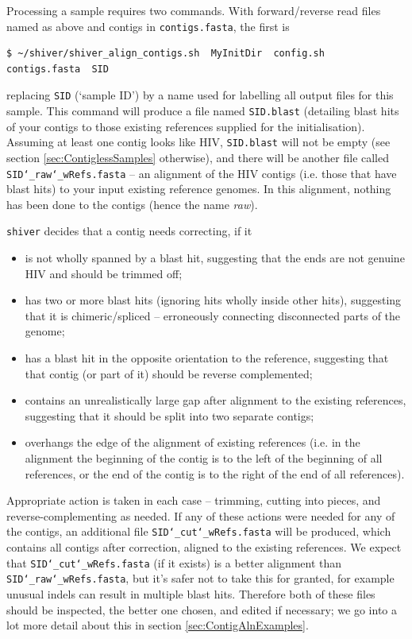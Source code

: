 \documentclass{article}
\newcommand{\shiv}{\c{shiver}\xspace}
\let\c\texttt
\begin{document}
Processing a sample requires two commands.
With forward/reverse read files named as above and contigs in \c{contigs.fasta}, the first is  
\begin{Verbatim}[samepage=true]
$ ~/shiver/shiver_align_contigs.sh  MyInitDir  config.sh  contigs.fasta  SID
\end{Verbatim}
replacing \c{SID} (`sample ID') by a name used for labelling all output files for this sample.
This command will produce a file named \c{SID.blast} (detailing blast hits of your contigs to those existing references supplied for the initialisation).
Assuming at least one contig looks like HIV, \c{SID.blast} will not be empty (see section \ref{sec:ContiglessSamples} otherwise), and there will be another file called \c{SID\char`_raw\char`_wRefs.fasta} -- an alignment of the HIV contigs (i.e. those that have blast hits) to your input existing reference genomes.
In this alignment, nothing has been done to the contigs (hence the name {\it raw}).

\shiv decides that a contig needs correcting, if it
\begin{itemize}
 \item is not wholly spanned by a blast hit, suggesting that the ends are not genuine HIV and should be trimmed off;
 \item has two or more blast hits (ignoring hits wholly inside other hits), suggesting that it is chimeric/spliced -- erroneously connecting disconnected parts of the genome;
 \item has a blast hit in the opposite orientation to the reference, suggesting that that contig (or part of it) should be reverse complemented;
 \item contains an unrealistically large gap after alignment to the existing references, suggesting that it should be split into two separate contigs;
 \item overhangs the edge of the alignment of existing references (i.e. in the alignment the beginning of the contig is to the left of the beginning of all references, or the end of the contig is to the right of the end of all references).
\end{itemize}
Appropriate action is taken in each case -- trimming, cutting into pieces, and reverse-complementing as needed.
If any of these actions were needed for any of the contigs, an additional file \c{SID\char`_cut\char`_wRefs.fasta} will be produced, which contains all contigs after correction, aligned to the existing references.
We expect that \c{SID\char`_cut\char`_wRefs.fasta} (if it exists) is a better alignment than \c{SID\char`_raw\char`_wRefs.fasta}, but it's safer not to take this for granted, for example unusual indels can result in multiple blast hits.
Therefore both of these files should be inspected, the better one chosen, and edited if necessary; we go into a lot more detail about this in section \ref{sec:ContigAlnExamples}.
\end{document}
